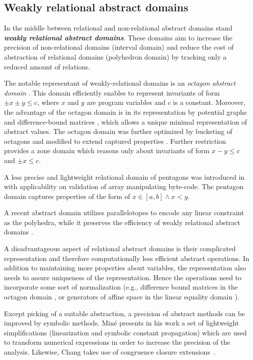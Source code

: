 \subsection{Weakly relational abstract domains}

In the middle between relational and non-relational abstract domains stand
\textbf{\emph{weakly relational abstract domains}}. These domains aim to
increase the precision of non-relational domains (interval domain) and reduce
the cost of abstraction of relational domains (polyhedron domain) by tracking
only a reduced amount of relations.

The notable representant of weakly-relational domains is an \emph{octagon
abstract domain} \cite{Mine2006}. This domain efficiently enables to represent
invariants of form $\pm x \pm y \leq c$, where $x$ and $y$ are program
variables and $c$ is a constant.  Moreover, the advantage of the octagon domain
is in its representation by potential graphs and difference-bound matrices
\cite{Larsen1997}, which allows a unique minimal representation of abstract
values. The octagon domain was further optimized by bucketing of octagons
\cite{Blanchet2003, Venet2004} and modified to extend captured properties
\cite{Claris2004, Mine2004}. Further restriction provides a zone domain
\cite{Mine2001} which reasons only about invariants of form $x - y \leq c$ and
$\pm x \leq c$.

A less precise and lightweight relational domain of pentagons was introduced in
\cite{Logozzo2010} with applicability on validation of array manipulating
byte-code. The pentagon domain captures properties of the form of $x \in [a,b]
\wedge x < y$.

A recent abstract domain utilizes parallelotopes to encode any linear
constraint as the polyhedra, while it preserves the efficiency of weakly
relational abstract domains \cite{Amato2017}.

A disadvantageous aspect of relational abstract domains is their complicated
representation and therefore computationally less efficient abstract
operations. In addition to maintaining more properties about variables, the
representation also needs to assure uniqueness of the representation. Hence the
operations need to incorporate some sort of normalization (e.g., difference
bound matrices in the octagon domain \cite{Mine2006}, or generators of affine
space in the linear equality domain \cite{Karr1976}).

Except picking of a suitable abstraction, a precision of abstract methods can
be improved by symbolic methods. Miné presents in his work \cite{Mine2006b} a
set of lightweight simplifications (linearization and symbolic constant
propagation) which are used to transform numerical expressions in order to
increase the precision of the analysis. Likewise, Chang takes use of congruence
closure extensions~\cite{Chang2005}.

